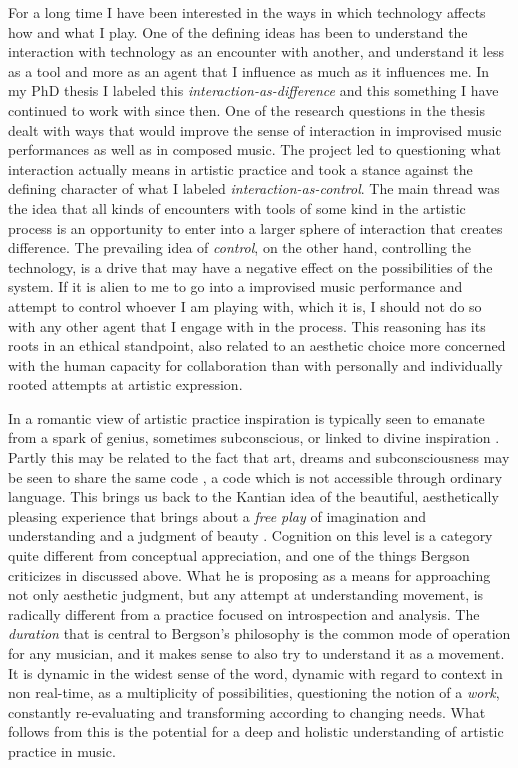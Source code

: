 \documentclass[11pt]{article}
\begin{document}
For a long time I have been interested in the ways in which technology affects how and what I play. One of the defining ideas has been to understand the interaction with technology as an encounter with another, and understand it less as a tool and more as an agent that I influence as much as it influences me. In my PhD thesis \citep{frisk08phd} I labeled this \emph{interaction-as-difference}  and this something I have continued to work with since then. One of the research questions in the thesis dealt with ways that would improve the sense of interaction in improvised music performances as well as in composed music. The project led to questioning what interaction actually means in artistic practice and took a stance against the defining character of what I labeled \emph{interaction-as-control}. The main thread was the idea that all kinds of encounters with tools of some kind in the artistic process is an opportunity to enter into a larger sphere of interaction that creates difference. The prevailing idea of \emph{control}, on the other hand, controlling the technology, is a drive that may have a negative effect on the possibilities of the system. If it is alien to me to go into a improvised music performance and attempt to control whoever I am playing with, which it is, I should not do so with any other agent that I engage with in the process. This reasoning has its roots in an ethical standpoint, also related to an aesthetic choice more concerned with the human capacity for collaboration than with personally and individually rooted attempts at artistic expression.

In a romantic view of artistic practice inspiration is typically seen to emanate from a spark of genius, sometimes subconscious, or linked to divine inspiration \citep{frisk2013}. Partly this may be related to the fact that art, dreams and subconsciousness may be seen to share the same code \citep[for a more in-depth discussion of this, see ][ ]{frisk2015,frisk09:improv}, a code which is not accessible through ordinary language. This brings us back to the Kantian idea of the beautiful, aesthetically pleasing experience that brings about a \emph{free play} of imagination and understanding and a judgment of beauty \citep[for a discussion on Kant's judgment of beauty, see ][]{Coate2018}. Cognition on this level is a category quite different from conceptual appreciation, and one of the things Bergson criticizes in  discussed above. What he is proposing as a means for approaching not only aesthetic judgment, but any attempt at understanding movement, is radically different from a practice focused on introspection and analysis. The \emph{duration} that is central to Bergson's philosophy is the common mode of operation for any musician, and it makes sense to also try to understand it as a movement. It is dynamic in the widest sense of the word, dynamic with regard to context in non real-time, as a multiplicity of possibilities, questioning the notion of a \emph{work}, constantly re-evaluating and transforming according to changing needs. What follows from this is the potential for a deep and holistic understanding of artistic practice in music.
\end{document}
